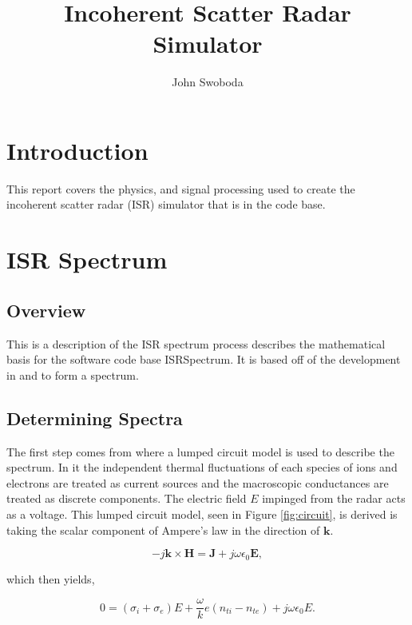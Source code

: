 \documentclass[10pt]{report}
\author{John Swoboda}
\title{\textbf{Incoherent Scatter Radar Simulator}}
\begin{document}
\maketitle

\chapter{Introduction}

This report covers the physics, and signal processing used to create the incoherent scatter radar (ISR) simulator that is in the code base. 

\chapter{ISR Spectrum}
\section*{Overview}

This is a description of the ISR spectrum process describes the mathematical basis for the software code base ISRSpectrum. It is based off of the development in  \cite{kudeki:milla:1} and \cite{Kudeki:2006kx} to form a spectrum.

\section*{Determining Spectra}
The first step comes from \cite{kudeki:milla:1} where a lumped circuit model is used to describe the spectrum. In it the independent thermal fluctuations of each species of ions and electrons are treated as current sources and the macroscopic conductances are treated as discrete components. The electric field $E$ impinged from the radar acts as a voltage. This lumped circuit model, seen in Figure \ref{fig:circuit}, is derived is taking the scalar component of Ampere's law in the direction of $\mathbf{k}$.  

\begin{equation}
\label{eq:ampere}
-j\mathbf{k} \times \mathbf{H} = \mathbf{J} +j\omega \epsilon_0 \mathbf{E},
\end{equation}

\noindent which then yields,

\begin{equation} 
\label{eq:ampscaler}
0=(\sigma_i +\sigma_e)E +\frac{\omega}{k}e(n_{ti}-n_{te}) +j\omega \epsilon_0 E.
\end{equation}
\end{document}
